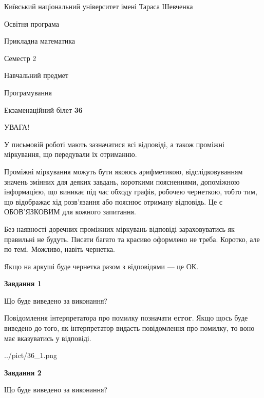 \documentclass[12pt, ukrainian]{article}
\begin{document}
{{\begin {small}\par
{ \center  Київський національний університет імені Тараса Шевченка \par}
{\parbox {5 cm}{Освітня програма \hfill}{\parbox {7 cm}{Прикладна математика \hfill}}\parbox {6 cm}{\hfill Семестр 2}}\par
{\parbox {5 cm} {Навчальний предмет \hfill}\parbox {7 cm}{Програмування \hfill}\parbox {6cm}{\hfill}\par}\vspace{-7pt} \end{small}}{\center Екзаменаційний білет \No \textbf
{ 36 }\par}}
{
\begin {large}
УВАГА!

У письмовій роботі мають зазначатися всі відповіді, а також проміжні міркування, що передували їх отриманню.

Проміжні міркування можуть бути якоюсь арифметикою, відслідковуванням зна\-чень змінних для деяких завдань,
короткими поясненнями, допоміжною інформацією, що виникає під час обходу графів, робочею чернеткою,
тобто тим, що відображає хід розв’язання або пояснює отриману відповідь.
Це є ОБОВ’ЯЗКОВИМ для кожного запитання.

Без наявності доречних проміжних міркувань відповіді зараховуватись як правиль\-ні не будуть.
Писати багато та красиво оформлено не треба. Коротко, але по темі. Можли\-во, навіть чернетка.

Якщо на аркуші буде чернетка разом з відповідями --- це ОК.

\newpage

{\begin {center}\textbf{Завдання 1}\end {center}}\par
Що буде виведено за виконання?

Повідомлення інтерпретатора про помилку позначати \textbf{error}.
Якщо щось буде виведено до того, як інтерпретатор видасть повідомлення про помилку, 
то воно має вказуватись у відповіді. \par


\begin{center}
	{../pict/36_1.png}
\end{center}
\newpage

{\begin {center}\textbf{Завдання 2}\end {center}}\par
Що буде виведено за виконання?


\end{large}}
\end{document}
